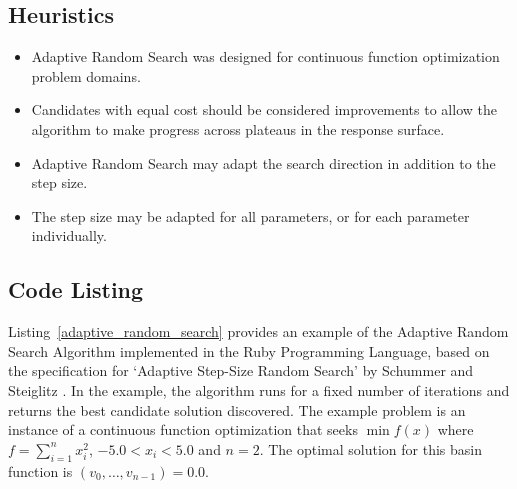 \subsection{Heuristics}
\begin{itemize}
	\item Adaptive Random Search was designed for continuous function optimization problem domains.
	\item Candidates with equal cost should be considered improvements to allow the algorithm to make progress across plateaus in the response surface.
	\item Adaptive Random Search may adapt the search direction in addition to the step size.
	\item The step size may be adapted for all parameters, or for each parameter individually.
\end{itemize}

\subsection{Code Listing}
Listing~\ref{adaptive_random_search} provides an example of the Adaptive Random Search Algorithm implemented in the Ruby Programming Language, based on the specification for `Adaptive Step-Size Random Search' by Schummer and Steiglitz \cite{Schumer1968}. 
In the example, the algorithm runs for a fixed number of iterations and returns the best candidate solution discovered. 
The example problem is an instance of a continuous function optimization that seeks $\min f(x)$ where $f=\sum_{i=1}^n x_{i}^2$, $-5.0 < x_i < 5.0$ and $n=2$. The optimal solution for this basin function is $(v_0,\ldots,v_{n-1})=0.0$.

